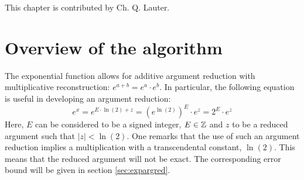 %
%
%
%


This chapter is contributed by Ch. Q. Lauter.


\section{Overview of the algorithm}
The exponential function allows for additive argument reduction with
multiplicative reconstruction: $e^{a + b} = e^a \cdot e^b$. In
particular, the following equation is useful in developing an
argument reduction:
$$e^x = e^{E \cdot \ln\left(2\right) + z} = \left(e^{\ln\left( 2
\right)}\right)^E \cdot e^z = 2^E \cdot e^z$$ Here, $E$ can be
considered to be a signed integer, $E \in \mathbb {Z}$ and $z$ to be a reduced
argument such that $\left \vert z \right \vert <
\ln\left(2\right)$. One remarks that the use of such an argument
reduction implies a multiplication with a transcendental constant,
$\ln\left( 2 \right)$.  This means that the reduced argument will not
be exact. The corresponding error bound will be given in section
\ref{sec:expargred}.

